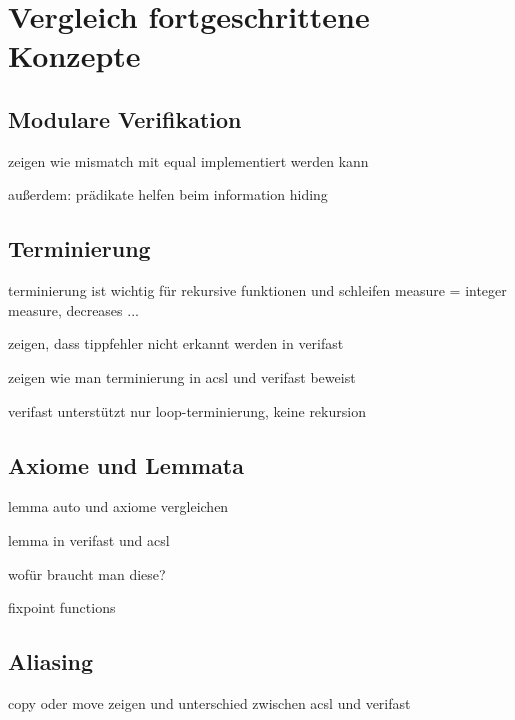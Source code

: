 ﻿
\chapter{Vergleich fortgeschrittene Konzepte}

\section{Modulare Verifikation}

zeigen wie mismatch mit equal implementiert werden kann

außerdem: prädikate helfen beim information hiding

\section{Terminierung}

terminierung ist wichtig für rekursive funktionen und schleifen
measure = integer measure, decreases ...

zeigen, dass tippfehler nicht erkannt werden in verifast

zeigen wie man terminierung in acsl und verifast beweist

verifast unterstützt nur loop-terminierung, keine rekursion


\section{Axiome und Lemmata}

lemma auto und axiome vergleichen

lemma in verifast und acsl

wofür braucht man diese?

fixpoint functions

\section{Aliasing}

copy oder move zeigen und unterschied zwischen acsl und verifast



